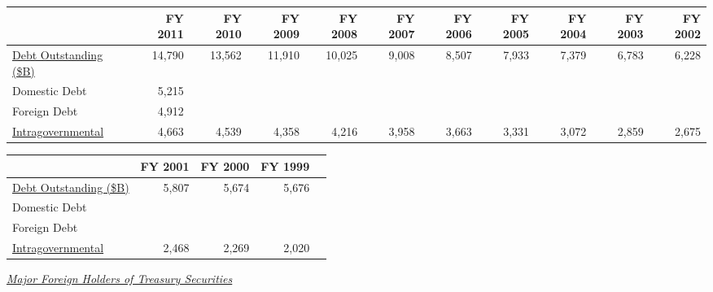 \documentclass{article}
\begin{document}
    \begin{table}[H]
      \begin{tabular}{lrrrrrrrrrr}
      \hline
      & FY 2011 & FY 2010 & FY 2009 & FY 2008 & FY 2007 & FY 2006 & FY 2005 & FY 2004 & FY 2003 & FY 2002 \\
      \hline
      \href{https://www.treasurydirect.gov/govt/reports/pd/histdebt/histdebt\_histo5.htm}{Debt Outstanding (\$B)} & 14,790 & 13,562 & 11,910 & 10,025 & 9,008 & 8,507 & 7,933 & 7,379 & 6,783 & 6,228 \\
      Domestic Debt & 5,215 & & & & & & & & & \\
      Foreign Debt & 4,912 & & & & & & & & & \\
      \href{https://fiscaldata.treasury.gov/datasets/debt-to-the-penny/debt-to-the-penny}{Intragovernmental} & 4,663 & 4,539 & 4,358 & 4,216 & 3,958 & 3,663 & 3,331 & 3,072 & 2,859 & 2,675 \\
      \hline
      \end{tabular}
    \end{table}
    
    \begin{table}[H]
      \begin{tabular}{lrrrr}
      \hline
      & FY 2001 & FY 2000 & FY 1999 \\
      \hline
      \href{https://www.treasurydirect.gov/govt/reports/pd/histdebt/histdebt\_histo5.htm}{Debt Outstanding (\$B)} & 5,807 & 5,674 & 5,676 \\
      Domestic Debt & & & \\
      Foreign Debt & & & \\
      \href{https://fiscaldata.treasury.gov/datasets/debt-to-the-penny/debt-to-the-penny}{Intragovernmental} & 2,468 & 2,269 & 2,020 \\
      \hline
      \end{tabular}
    \end{table}

    \href{https://ticdata.treasury.gov/Publish/mfh.txt}{\textit{Major Foreign Holders of Treasury Securities}}
\end{document}
